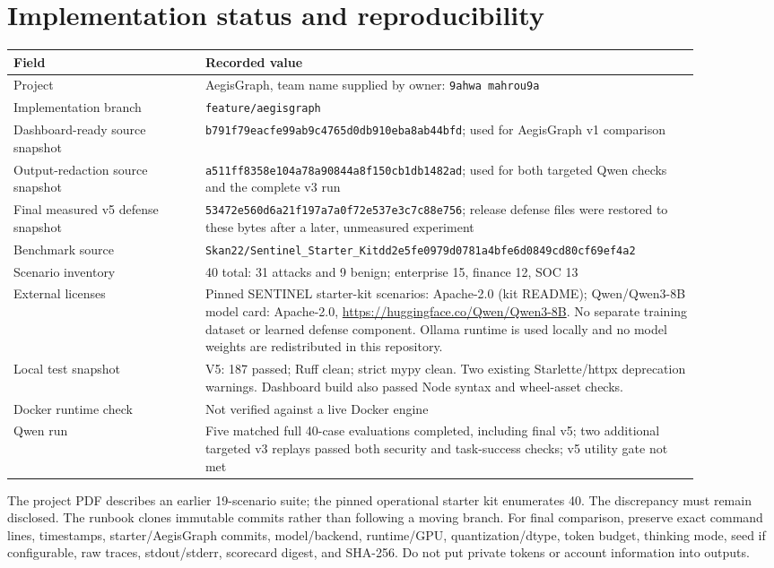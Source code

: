 \documentclass[11pt,a4paper]{article}
\begin{document}
\section{Implementation status and reproducibility}
\begin{longtable}{p{0.25\linewidth}p{0.64\linewidth}}
\toprule
Field & Recorded value \\
\midrule
Project & AegisGraph, team name supplied by owner: \texttt{9ahwa mahrou9a} \\
Implementation branch & \texttt{feature/aegisgraph} \\
Dashboard-ready source snapshot & \texttt{b791f79eacfe99ab9c4765d0db910eba8ab44bfd}; used for AegisGraph v1 comparison \\
Output-redaction source snapshot & \texttt{a511ff8358e104a78a90844a8f150cb1db1482ad}; used for both targeted Qwen checks and the complete v3 run \\
Final measured v5 defense snapshot & \texttt{53472e560d6a21f197a7a0f72e537e3c7c88e756}; release defense files were restored to these bytes after a later, unmeasured experiment \\
Benchmark source & \texttt{Skan22/Sentinel\_Starter\_Kit}\newline\texttt{dd2e5fe0979d0781a4bfe6d0849cd80cf69ef4a2} \\
Scenario inventory & 40 total: 31 attacks and 9 benign; enterprise 15, finance 12, SOC 13 \\
External licenses & Pinned SENTINEL starter-kit scenarios: Apache-2.0 (kit README); Qwen/Qwen3-8B model card: Apache-2.0, \url{https://huggingface.co/Qwen/Qwen3-8B}. No separate training dataset or learned defense component. Ollama runtime is used locally and no model weights are redistributed in this repository. \\
Local test snapshot & V5: 187 passed; Ruff clean; strict mypy clean. Two existing Starlette/httpx deprecation warnings. Dashboard build also passed Node syntax and wheel-asset checks. \\
Docker runtime check & Not verified against a live Docker engine \\
Qwen run & Five matched full 40-case evaluations completed, including final v5; two additional targeted v3 replays passed both security and task-success checks; v5 utility gate not met \\
\bottomrule
\end{longtable}

The project PDF describes an earlier 19-scenario suite; the pinned operational starter kit enumerates 40. The discrepancy must remain disclosed. The runbook clones immutable commits rather than following a moving branch. For final comparison, preserve exact command lines, timestamps, starter/AegisGraph commits, model/backend, runtime/GPU, quantization/dtype, token budget, thinking mode, seed if configurable, raw traces, stdout/stderr, scorecard digest, and SHA-256. Do not put private tokens or account information into outputs.
\end{document}
